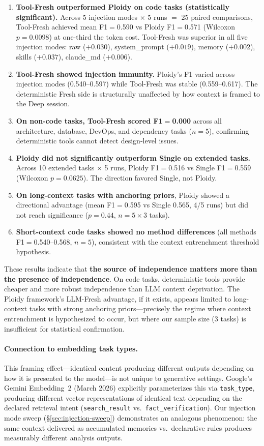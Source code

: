 \documentclass[11pt]{article}
\begin{document}
\begin{enumerate}[label=\arabic*., leftmargin=1.5em]
  \item \textbf{Tool-Fresh outperformed Ploidy on code tasks (statistically significant).} Across 5 injection modes $\times$ 5 runs $=$ 25 paired comparisons, Tool-Fresh achieved mean F1$=$0.590 vs Ploidy F1$=$0.571 (Wilcoxon $p{=}0.0098$) at one-third the token cost. Tool-Fresh was superior in all five injection modes: raw ($+0.030$), system\_prompt ($+0.019$), memory ($+0.002$), skills ($+0.037$), claude\_md ($+0.006$).
  \item \textbf{Tool-Fresh showed injection immunity.} Ploidy's F1 varied across injection modes (0.540--0.597) while Tool-Fresh was stable (0.559--0.617). The deterministic Fresh side is structurally unaffected by how context is framed to the Deep session.
  \item \textbf{On non-code tasks, Tool-Fresh scored F1$=$0.000} across all architecture, database, DevOps, and dependency tasks ($n{=}5$), confirming deterministic tools cannot detect design-level issues.
  \item \textbf{Ploidy did not significantly outperform Single on extended tasks.} Across 10 extended tasks $\times$ 5 runs, Ploidy F1$=$0.516 vs Single F1$=$0.559 (Wilcoxon $p{=}0.0625$). The direction favored Single, not Ploidy.
  \item \textbf{On long-context tasks with anchoring priors}, Ploidy showed a directional advantage (mean F1$=$0.595 vs Single 0.565, 4/5 runs) but did not reach significance ($p{=}0.44$, $n{=}5 \times 3$ tasks).
  \item \textbf{Short-context code tasks showed no method differences} (all methods F1$=$0.540--0.568, $n{=}5$), consistent with the context entrenchment threshold hypothesis.
\end{enumerate}

These results indicate that \textbf{the source of independence matters more than the presence of independence}. On code tasks, deterministic tools provide cheaper and more robust independence than LLM context deprivation. The Ploidy framework's LLM-Fresh advantage, if it exists, appears limited to long-context tasks with strong anchoring priors---precisely the regime where context entrenchment is hypothesized to occur, but where our sample size ($3$ tasks) is insufficient for statistical confirmation.

\paragraph{Connection to embedding task types.}
This framing effect---identical content producing different outputs depending on how it is presented to the model---is not unique to generative settings. Google's Gemini Embedding~2 (March 2026) explicitly parameterizes this via \texttt{task\_type}, producing different vector representations of identical text depending on the declared retrieval intent (\texttt{search\_result} vs.\ \texttt{fact\_verification}). Our injection mode sweep (\S\ref{sec:injection-sweep}) demonstrates an analogous phenomenon: the same context delivered as accumulated memories vs.\ declarative rules produces measurably different analysis outputs.
\end{document}
